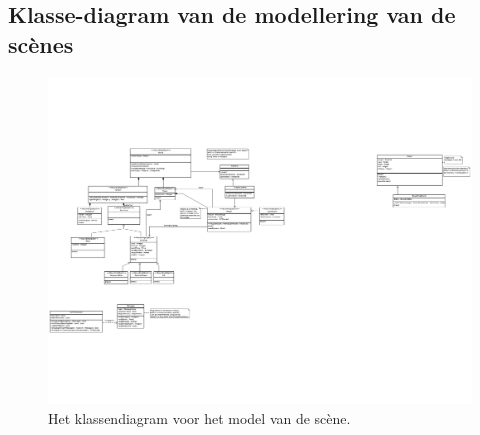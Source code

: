 \documentclass[a4paper,11pt]{article}
\begin{document}
    \subsection{Klasse-diagram van de modellering van de sc\`enes}
    \begin{figure}[h]
        \centering
    	\includegraphics{../Class-diagram/SceneModel.pdf}
	\caption{Het klassendiagram voor het model van de sc\`ene.}
    \end{figure}
    \label{app:Scene}
    \FloatBarrier
    \newpage
\end{document}
